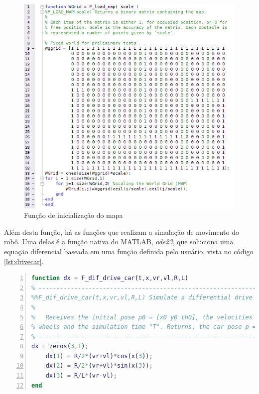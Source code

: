 \documentclass[
	12pt,				%
	openright,			%
	oneside,			%
	a4paper,			%
	english,			%
	french,				%
	spanish,			%
	brazil,				%
	]{abntex2}
\begin{document}
\begin{figure}[h!]
    \centering
    \includegraphics[scale = 0.45]{figs/loadmap}
    \caption{Função de inicialização do mapa}
    \label{fig:loadmap}
\end{figure}
\newpage

Além desta função, há as funções que realizam a simulação de movimento do robô. Uma delas é a função nativa do MATLAB, \emph{ode23}, que soluciona uma equação diferencial baseada em uma função definida pelo usuário, vista no código \ref{lst:drivecar}.



\begin{lstlisting}[language=matlab,numbers=left,basicstyle=\tiny, caption={Função de simulação de movimentação do robô.}, label=lst:drivecar]
function dx = F_dif_drive_car(t,x,vr,vl,R,L)
% ----------------------------------------------------------------------
%%F_dif_drive_car(t,x,vr,vl,R,L) Simulate a differential drive car
%
%   Receives the initial pose p0 = [x0 y0 th0], the velocities of the 
% wheels and the simulation time "T". Returns, the car pose p = [x y th].
% ----------------------------------------------------------------------
dx = zeros(3,1);
    dx(1) = R/2*(vr+vl)*cos(x(3));
    dx(2) = R/2*(vr+vl)*sin(x(3));    
    dx(3) = R/L*(vr-vl);
end\end{lstlisting}
\end{document}

